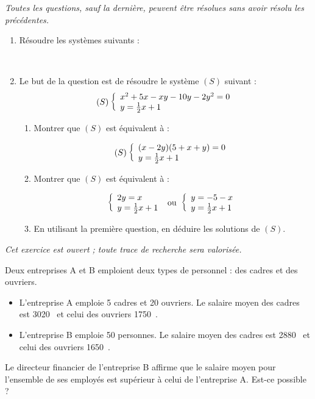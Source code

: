 \documentclass[11pt]{article}
\begin{document}
\newpage

\begin{exercice}\emph{Toutes les questions,
  sauf la dernière, peuvent être résolues sans avoir résolu les précédentes.}
  \begin{enumerate}
    \item Résoudre les systèmes suivants :

      ~

    \item Le but de la question est de résoudre le système $(S)$ suivant :
      \[(S)\left\{\begin{array}{l}x^2+5x-xy-10y-2y^2=0\\y=\frac{1}{2}x+1\end{array}\right.\]
      \begin{enumerate}
        \item Montrer que $(S)$ est équivalent à :

          \[(S)\left\{\begin{array}{l}(x-2y)(5+x+y)=0\\y=\frac{1}{2}x+1\end{array}\right.\]
        \item Montrer que $(S)$ est équivalent à :

          \[\left\{\begin{array}{l}2y=x\\y=\frac{1}{2}x+1\end{array}\right. \text{ ou } \left\{\begin{array}{l}y=-5-x\\y=\frac{1}{2}x+1\end{array}\right.\]
        \item En utilisant la première question, en déduire les solutions de $(S)$.
      \end{enumerate}
  \end{enumerate}
\end{exercice}

\begin{exercice}\emph{Cet exercice est ouvert ; toute trace de recherche sera valorisée.}

 Deux entreprises A et B emploient deux types de personnel : des cadres et des ouvriers. 
\begin{itemize} 
 \item L'entreprise A emploie 5 cadres et 20 ouvriers. Le salaire moyen des cadres est 3020~\officialeuro{} et celui des ouvriers 1750~\officialeuro.
\item  L'entreprise B emploie 50 personnes. Le salaire moyen des cadres est 2880~\officialeuro{} et celui des ouvriers 1650~\officialeuro.
\end{itemize}
 Le directeur financier de l'entreprise B affirme que le salaire moyen pour l'ensemble de ses employés est supérieur à celui de l'entreprise A. Est-ce possible ? 
\end{exercice}
\end{document}

